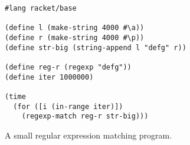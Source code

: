\begin{figure}[!h]
	\centering
	\begin{minipage}{0.6\textwidth}
		\begin{lstlisting}[language=racket, basicstyle=\ttfamily\footnotesize]
#lang racket/base

(define l (make-string 4000 #\a))
(define r (make-string 4000 #\p))
(define str-big (string-append l "defg" r))

(define reg-r (regexp "defg"))
(define iter 1000000)

(time
  (for ([i (in-range iter)])
    (regexp-match reg-r str-big)))
		\end{lstlisting}
	\end{minipage}
\caption{\small A small regular expression matching program.}
\label{fig:regexp-example-defg}
\end{figure}
